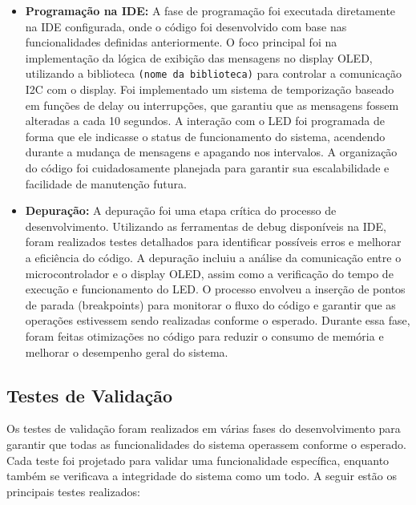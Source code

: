 \documentclass{article}
\begin{document}
\begin{itemize}
    \item \textbf{Programação na IDE:} A fase de programação foi executada diretamente na IDE configurada, onde o código foi desenvolvido com base nas funcionalidades definidas anteriormente. O foco principal foi na implementação da lógica de exibição das mensagens no display OLED, utilizando a biblioteca \texttt{(nome da biblioteca)} para controlar a comunicação I2C com o display. Foi implementado um sistema de temporização baseado em funções de delay ou interrupções, que garantiu que as mensagens fossem alteradas a cada 10 segundos. A interação com o LED foi programada de forma que ele indicasse o status de funcionamento do sistema, acendendo durante a mudança de mensagens e apagando nos intervalos. A organização do código foi cuidadosamente planejada para garantir sua escalabilidade e facilidade de manutenção futura.
    
    \item \textbf{Depuração:} A depuração foi uma etapa crítica do processo de desenvolvimento. Utilizando as ferramentas de debug disponíveis na IDE, foram realizados testes detalhados para identificar possíveis erros e melhorar a eficiência do código. A depuração incluiu a análise da comunicação entre o microcontrolador e o display OLED, assim como a verificação do tempo de execução e funcionamento do LED. O processo envolveu a inserção de pontos de parada (breakpoints) para monitorar o fluxo do código e garantir que as operações estivessem sendo realizadas conforme o esperado. Durante essa fase, foram feitas otimizações no código para reduzir o consumo de memória e melhorar o desempenho geral do sistema.
\end{itemize}

\subsection{Testes de Validação}

Os testes de validação foram realizados em várias fases do desenvolvimento para garantir que todas as funcionalidades do sistema operassem conforme o esperado. Cada teste foi projetado para validar uma funcionalidade específica, enquanto também se verificava a integridade do sistema como um todo. A seguir estão os principais testes realizados:
\end{document}
